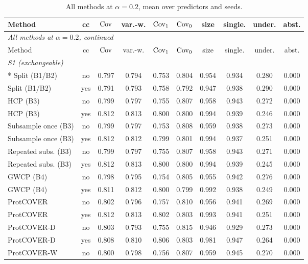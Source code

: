\begin{longtable}{lccccccccc}
\caption{All methods at $\alpha=0.2$, mean over predictors and seeds.}\label{tab:full20}\\
\toprule
Method & cc & $\mathrm{Cov}$ & var.-w. & $\mathrm{Cov}_1$ & $\mathrm{Cov}_0$ & size & single. & under. & abst. \\
\midrule
\endfirsthead
\multicolumn{10}{l}{\emph{All methods at $\alpha=0.2$, continued}}\\
\toprule
Method & cc & $\mathrm{Cov}$ & var.-w. & $\mathrm{Cov}_1$ & $\mathrm{Cov}_0$ & size & single. & under. & abst. \\
\midrule
\endhead
\multicolumn{10}{l}{\emph{S1 (exchangeable)}}\\*
Split (B1/B2) & no & 0.797 & 0.794 & 0.753 & 0.804 & 0.954 & 0.934 & 0.280 & 0.000 \\
Split (B1/B2) & yes & 0.791 & 0.793 & 0.758 & 0.792 & 0.947 & 0.938 & 0.290 & 0.000 \\
HCP (B3) & no & 0.799 & 0.797 & 0.755 & 0.807 & 0.958 & 0.943 & 0.272 & 0.000 \\
HCP (B3) & yes & 0.812 & 0.813 & 0.800 & 0.800 & 0.994 & 0.939 & 0.246 & 0.000 \\
Subsample once (B3) & no & 0.799 & 0.797 & 0.753 & 0.808 & 0.959 & 0.938 & 0.273 & 0.000 \\
Subsample once (B3) & yes & 0.812 & 0.812 & 0.799 & 0.801 & 0.994 & 0.937 & 0.251 & 0.000 \\
Repeated subs. (B3) & no & 0.799 & 0.797 & 0.755 & 0.807 & 0.958 & 0.943 & 0.271 & 0.000 \\
Repeated subs. (B3) & yes & 0.812 & 0.813 & 0.800 & 0.800 & 0.994 & 0.939 & 0.245 & 0.000 \\
GWCP (B4) & no & 0.798 & 0.795 & 0.754 & 0.805 & 0.955 & 0.942 & 0.276 & 0.000 \\
GWCP (B4) & yes & 0.811 & 0.812 & 0.800 & 0.799 & 0.992 & 0.938 & 0.249 & 0.000 \\
ProtCOVER & no & 0.802 & 0.796 & 0.757 & 0.810 & 0.956 & 0.941 & 0.269 & 0.000 \\
ProtCOVER & yes & 0.812 & 0.813 & 0.802 & 0.803 & 0.993 & 0.941 & 0.251 & 0.000 \\
ProtCOVER-D & no & 0.803 & 0.793 & 0.755 & 0.815 & 0.946 & 0.929 & 0.273 & 0.000 \\
ProtCOVER-D & yes & 0.808 & 0.810 & 0.806 & 0.803 & 0.981 & 0.947 & 0.264 & 0.000 \\
ProtCOVER-W & no & 0.800 & 0.798 & 0.756 & 0.807 & 0.959 & 0.945 & 0.270 & 0.000 \\

\end{longtable}
